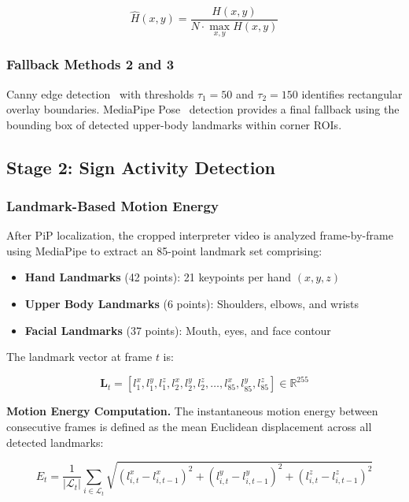 \documentclass[journal]{IEEEtran}
\begin{document}
\begin{equation}
\hat{H}(x, y) = \frac{H(x, y)}{N \cdot \max_{x,y} H(x, y)}
\end{equation}

\subsubsection{Fallback Methods 2 and 3}

Canny edge detection~\cite{canny1986computational} with thresholds $\tau_1 = 50$ and $\tau_2 = 150$ identifies rectangular overlay boundaries. MediaPipe Pose~\cite{bazarevsky2020blazepose} detection provides a final fallback using the bounding box of detected upper-body landmarks within corner ROIs.

\subsection{Stage 2: Sign Activity Detection}

\subsubsection{Landmark-Based Motion Energy}

After PiP localization, the cropped interpreter video is analyzed frame-by-frame using MediaPipe to extract an 85-point landmark set comprising:

\begin{itemize}
    \item \textbf{Hand Landmarks} (42 points): 21 keypoints per hand $(x, y, z)$
    \item \textbf{Upper Body Landmarks} (6 points): Shoulders, elbows, and wrists
    \item \textbf{Facial Landmarks} (37 points): Mouth, eyes, and face contour
\end{itemize}

The landmark vector at frame $t$ is:

\begin{equation}
\mathbf{L}_t = [l_1^x, l_1^y, l_1^z, l_2^x, l_2^y, l_2^z, \ldots, l_{85}^x, l_{85}^y, l_{85}^z] \in \mathbb{R}^{255}
\end{equation}

\textbf{Motion Energy Computation.} The instantaneous motion energy between consecutive frames is defined as the mean Euclidean displacement across all detected landmarks:

\begin{equation}
E_t = \frac{1}{|\mathcal{L}_t|} \sum_{i \in \mathcal{L}_t} \sqrt{(l_{i,t}^x - l_{i,t-1}^x)^2 + (l_{i,t}^y - l_{i,t-1}^y)^2 + (l_{i,t}^z - l_{i,t-1}^z)^2}
\label{eq:motion_energy}
\end{equation}
\end{document}

